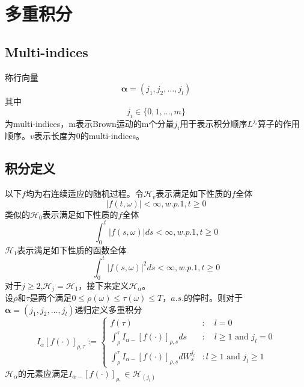 \documentclass{article}%
\begin{document}
\section{多重积分}
\subsection{Multi-indices}
称行向量
$$
\boldsymbol{\alpha}=\left(j_{1}, j_{2}, \dots, j_{l}\right)
$$
其中$$
j_{i} \in\{0,1, \ldots, m\}
$$
为multi-indices，m表示Brown运动的m个分量$j_i$用于表示积分顺序$L^{j_i}$算子的作用顺序。$v$表示长度为0的multi-indices。
\subsection{积分定义}
以下$f$均为右连续适应的随机过程。令$\mathcal{H}_v$表示满足如下性质的$f$全体
$$|f(t,\omega)|<\infty, w.p.1,t\geq 0$$
类似的$\mathcal{H}_0$表示满足如下性质的$f$全体
$$
\int_{0}^{t}|f(s, \omega)| d s<\infty,w.p.1,t\geq 0
$$
$\mathcal{H}_1$表示满足如下性质的函数全体
$$
\int_{0}^{t}|f(s, \omega)|^2 d s<\infty,w.p.1,t\geq 0
$$
对于$j\geq2$,$\mathcal{H}_j=\mathcal{H}_1$，接下来定义$\mathcal{H}_{\alpha}$。\\
设$\rho$和$\tau$是两个满足$0\leq \rho(\omega)\leq \tau(\omega)\leq T，a.s.$的停时。则对于$\boldsymbol{\alpha}=\left(j_{1}, j_{2}, \dots, j_{l}\right)$递归定义多重积分
\begin{equation}
I_{\alpha}[f(\cdot)]_{\rho, \tau}:=\left\{\begin{array}{ll}
f(\tau) & : \quad l=0 \\
\int_{\rho}^{\tau} I_{\alpha-}[f(\cdot)]_{\rho, s} d s & : \quad l \geq 1 \text { and } j_{l}=0 \\
\int_{\rho}^{\tau} I_{\alpha-}[f(\cdot)]_{\rho, s} d W_{s}^{j_{l}} & : l \geq 1 \text { and } j_{l} \geq 1
\end{array}\right.
\end{equation}
$\mathcal{H}_{\alpha}$的元素应满足$I_{\alpha-}[f(\cdot)]_{\rho,} \in \mathcal{H}_{\left(j_{l}\right)}$
\end{document}

